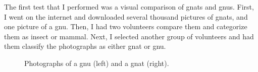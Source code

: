 \documentclass[12pt]{thesis}
\begin{document}
The first test that I performed was a visual comparison of gnats and
gnus.  First, I went on the internet and downloaded several thousand
pictures of gnats, and one picture of a gnu.  Then, I had two
volunteers compare them and categorize them as insect
or mammal.
Next, I selected another group of volunteers and
had them classify the photographs as either gnat or gnu.


\begin{figure}
\begin{center}
\end{center}
\caption{Photographs of a gnu (left) and a gnat (right).}
\label{figure:photos}
\end{figure}
\end{document}
